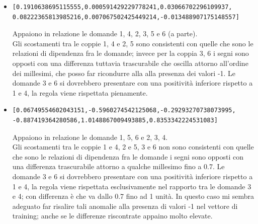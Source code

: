 \begin{itemize}
\item \begin{verbatim}[0.1910638695115555,0.000591429229778241,0.03066702296109937,
0.08222365813985216,0.007067502425449214,-0.013488907175148557]
\end{verbatim}
Appaiono in relazione le domande 1, 4, 2, 3, 5 e 6 (a parte).\\
Gli scostamenti tra le coppie 1, 4 e 2, 5 sono consistenti con quelle che sono le relazioni di dipendenza fra le domande; invece per la coppia 3, 6 i segni sono opposti con una differenza tuttavia trascurabile  che oscilla attorno all'ordine dei millesimi, che posso far ricondurre alla alla presenza dei valori -1.
Le domande 3 e 6 si dovrebbero presentare con una positivit\`a inferiore rispetto a 1 e 4, la regola viene rispettata pienamente.

\item \begin{verbatim}[0.06749554602043151,-0.5960274542125068,-0.29293270738073995,
-0.887419364280586,1.0148867009493885,0.8353342224531083]
\end{verbatim}
Appaiono in relazione le domande 1, 5, 6 e 2, 3, 4.\\
Gli scostamenti tra le coppie 1 e 4, 2 e 5, 3 e 6 non sono consistenti con quelle che sono le relazioni di dipendenza fra le domande i segni sono opposti con una differenza trascurabile attorno a qualche millesimo fino a 0.7. 
Le domande 3 e 6 si dovrebbero presentare con una positivit\`a inferiore rispetto a 1 e 4, la regola viene rispettata  esclusivamente nel rapporto tra le domande 3 e 4; con differenza \`e che va dallo 0.7 fino ad 1 unit\`a. In questo caso  mi sembra adeguato far risalire tali anomalie alla presenza di valori -1 nel vettore di training; anche se le differenze riscontrate appaino molto elevate.
\end{itemize}


